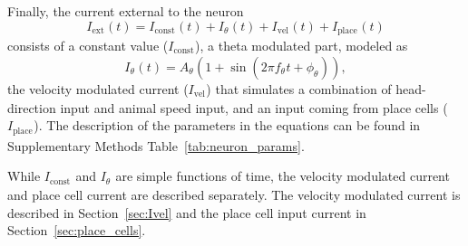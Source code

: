 \documentclass[a4paper,12pt]{article}
\newcommand{\ssc}[3]{\ensuremath{#1_{\text{#2}_{\text{#3}}}}}
\newcommand{\Iext}     {\ssc{I}      {ext}   {}}
\newcommand{\Iconst}   {\ssc{I}      {const} {}}
\newcommand{\Itheta}   {\ssc{I}      {$\theta$}{}}
\newcommand{\Atheta}   {\ssc{A}      {$\theta$}{}}
\newcommand{\ftheta}   {\ssc{f}      {$\theta$}{}}
\newcommand{\phitheta} {\ssc{\phi}   {$\theta$}{}}
\newcommand{\Ivel}     {\ssc{I}      {vel}   {}}
\newcommand{\Iplace}   {\ssc{I}      {place} {}}
\begin{document}
Finally, the current external to the neuron
\begin{equation}
    \Iext(t) = \Iconst(t) + \Itheta(t) + \Ivel(t) + \Iplace(t)
    \label{eq:Iext}
\end{equation}
consists of a constant value ($\Iconst$), a theta modulated part, modeled as
\begin{equation}
    \Itheta(t) = \Atheta (1 + \sin(2\pi\ftheta t + \phitheta)),
    \label{eq:Itheta}
\end{equation}
the velocity modulated current ($\Ivel$) that simulates a combination of
head-direction input and animal speed input, and an input coming from place
cells ($\Iplace$).  The description of the parameters in the equations can be
found in Supplementary Methods Table~\ref{tab:neuron_params}.

While $\Iconst$ and $\Itheta$ are simple functions of time, the velocity
modulated current and place cell current are described separately. The velocity
modulated current is described in Section~\ref{sec:Ivel} and the place cell
input current in Section~\ref{sec:place_cells}.
\end{document}
